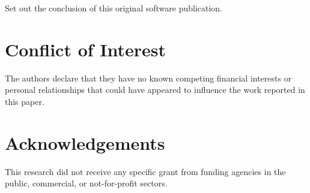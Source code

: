 \documentclass[preprint,12pt, a4paper]{elsarticle}
\begin{document}
Set out the conclusion of this original software publication.


\section{Conflict of Interest}
%

The authors declare that they have no known competing financial interests or personal relationships that could have appeared to influence the work reported in this paper.


\section*{Acknowledgements}
\label{}

This research did not receive any specific grant from funding agencies in the public, commercial, or
not-for-profit sectors.



 
 
\end{document}
